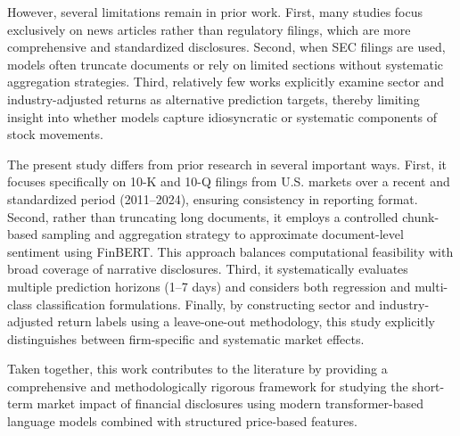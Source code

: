 However, several limitations remain in prior work. First, many studies focus exclusively on news articles rather than regulatory filings, which are more comprehensive and standardized disclosures. Second, when SEC filings are used, models often truncate documents or rely on limited sections without systematic aggregation strategies. Third, relatively few works explicitly examine sector and industry-adjusted returns as alternative prediction targets, thereby limiting insight into whether models capture idiosyncratic or systematic components of stock movements.

The present study differs from prior research in several important ways. First, it focuses specifically on 10-K and 10-Q filings from U.S. markets over a recent and standardized period (2011--2024), ensuring consistency in reporting format. Second, rather than truncating long documents, it employs a controlled chunk-based sampling and aggregation strategy to approximate document-level sentiment using FinBERT. This approach balances computational feasibility with broad coverage of narrative disclosures. Third, it systematically evaluates multiple prediction horizons (1--7 days) and considers both regression and multi-class classification formulations. Finally, by constructing sector and industry-adjusted return labels using a leave-one-out methodology, this study explicitly distinguishes between firm-specific and systematic market effects.

Taken together, this work contributes to the literature by providing a comprehensive and methodologically rigorous framework for studying the short-term market impact of financial disclosures using modern transformer-based language models combined with structured price-based features.